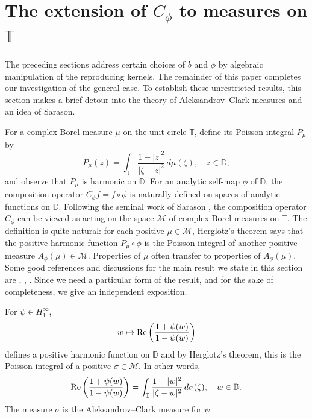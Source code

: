 \documentclass[11pt]{amsart}
\def\D{\mathbb{D}}
\def\T{\mathbb{T}}
\def\MM{{\mathcal M}}
\renewcommand{\Re}{\mathop{\rm Re}}
\numberwithin{equation}{section}
\theoremstyle{plain}
\theoremstyle{definition}
\begin{document}
\section{The extension of $C_\phi$ to measures on $\T$}\label{Clark}

The preceding sections address certain choices of $b$ and $\phi$ by algebraic manipulation of the reproducing kernels. The remainder of this paper completes our investigation of the general case. To establish these unrestricted results, this section makes a brief detour into the theory of Aleksandrov–Clark measures and an idea of Sarason. 


For a complex Borel measure $\mu$ on the unit circle $\T$, define its Poisson integral $P_{\mu}$ by 
\[
P_{\mu}(z)=\int_{\T}\frac{1-|z|^2}{|\zeta-z|^2}\,d\mu(\zeta), \quad z \in \D,
\] 
and observe  that $P_{\mu}$ is harmonic on $\D$. 
For an analytic self-map $\phi$ of $\D$, the composition operator $C_\phi f = f \circ \phi$ is naturally defined on spaces of analytic functions on $\D$. Following the seminal work of Sarason \cite{sarason1990composition}, the composition operator $C_{\phi }$ can be viewed as acting on the space $\mathcal{M}$ of complex Borel measures on $\T$. The definition is quite natural: for each positive  $\mu\in\MM$, Herglotz's theorem \cite[Ch.~9]{CMR} says that the positive harmonic function $P_{\mu} \circ \phi$ is the Poisson integral of another positive measure $A_\phi(\mu) \in  \MM$. Properties of $\mu$ often transfer to properties of $A_\phi(\mu)$. 
Some good references and discussions for the main result we state in this section are \cite{MR2876277}, \cite[Thm.~5.1]{MR2394657}, \cite{MR994787}. Since we need a particular form of the result, and for the sake of completeness, we give an independent exposition.

For $\psi\in H^\infty_1$,
$$w \mapsto \Re\left(\frac{1+\psi(w)}{1-\psi(w)}\right)$$ defines a positive harmonic function on $\D$ and by Herglotz's theorem, this is the Poisson integral of a positive $\sigma \in \mathcal{M}$. In other words, 
\begin{equation}\label{eq:AC1}
	\Re\left(\frac{1+\psi(w)}{1-\psi(w)}\right)=\int_{\T}\frac{1-|w|^2}{|\zeta-w|^2}\, d\sigma(\zeta), \quad w \in \D.
\end{equation} 
The measure $\sigma$ is the  Aleksandrov--Clark measure for $\psi$.
\end{document}
